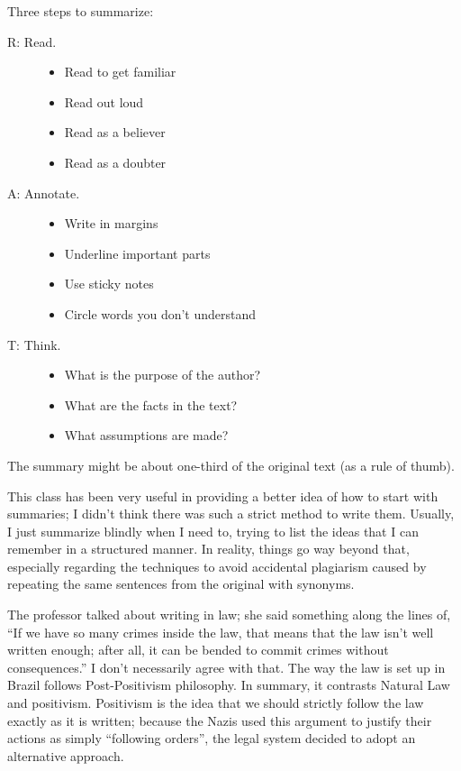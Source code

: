 Three steps to summarize:
\begin{description}
    \item[R: Read.] \hfill
    \begin{itemize}
        \item Read to get familiar
        \item Read out loud
        \item Read as a believer
        \item Read as a doubter
    \end{itemize}
    \item[A: Annotate.] \hfill
    \begin{itemize}
        \item Write in margins
        \item Underline important parts
        \item Use sticky notes
        \item Circle words you don't understand
    \end{itemize}
    \item[T: Think.] \hfill
    \begin{itemize}
        \item What is the purpose of the author?
        \item What are the facts in the text?
        \item What assumptions are made?
    \end{itemize}
\end{description}

The summary might be about one-third of the original text (as a rule of thumb).

This class has been very useful in providing a better idea of how to start with summaries; I didn't think there was such a strict method to write them. Usually, I just summarize blindly when I need to, trying to list the ideas that I can remember in a structured manner. In reality, things go way beyond that, especially regarding the techniques to avoid accidental plagiarism caused by repeating the same sentences from the original with synonyms.

The professor talked about writing in law; she said something along the lines of, ``If we have so many crimes inside the law, that means that the law isn't well written enough; after all, it can be bended to commit crimes without consequences.'' I don't necessarily agree with that. The way the law is set up in Brazil follows Post-Positivism philosophy. In summary, it contrasts Natural Law and positivism. Positivism is the idea that we should strictly follow the law exactly as it is written; because the Nazis used this argument to justify their actions as simply ``following orders'', the legal system decided to adopt an alternative approach.

